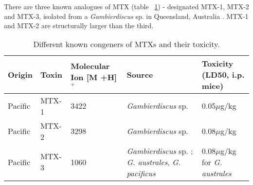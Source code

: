 \documentclass[12pt]{article}
\begin{document}
There are three known analogues of MTX (table ~\ref{tbl:MTXTable}) - designated MTX-1, MTX-2 and MTX-3, isolated from a \emph{Gambierdiscus} sp. in Queensland, Australia \cite{holmes1994purification}. MTX-1 and MTX-2 are structurally larger than the third. \\ %



\begin{table}
\caption{Different known congeners of MTXs and their toxicity.}
\label{tbl:MTXTable}
\begin{tabular}{ |  p{2cm} | p{2cm} | p{3cm} | p{3cm} | p{4cm} | }
\hline
\textbf{Origin} & \textbf{Toxin} & \textbf{Molecular Ion [M +H]$^{+}$} & \textbf{Source} & \textbf{Toxicity (LD50, i.p. mice)} \\
\hline
 Pacific & MTX-1 & 3422 \cite{holmes1994purification,murata1993structure} & \emph{Gambierdiscus} sp. \cite{holmes1994purification} & 0.05$\mu$g/kg \cite{murata1993structure}\\
 \hline
 Pacific & MTX-2 & 3298 \cite{holmes1994purification} & \emph{Gambierdiscus} sp. \cite{holmes1994purification} & 0.08$\mu$g/kg \cite{holmes1994purification}\\
 \hline
 Pacific & MTX-3 & 1060   \cite{holmes1994purification} & \emph{Gambierdiscus} sp. \cite{holmes1994purification}; \emph{G. australes}, \emph{G. pacificus} \cite{rhodes2014production} &  0.08$\mu$g/kg for \emph{G. australes}  \cite{rhodes2014production} \\
 \hline
\end{tabular}
\end{table}
\FloatBarrier
\end{document}
